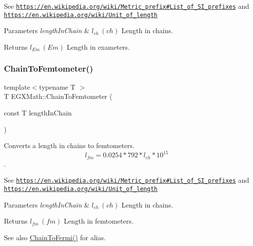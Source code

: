 See \href{https://en.wikipedia.org/wiki/Metric_prefix#List_of_SI_prefixes}{\tt https\+://en.\+wikipedia.\+org/wiki/\+Metric\+\_\+prefix\#\+List\+\_\+of\+\_\+\+S\+I\+\_\+prefixes} and \href{https://en.wikipedia.org/wiki/Unit_of_length}{\tt https\+://en.\+wikipedia.\+org/wiki/\+Unit\+\_\+of\+\_\+length} 
\begin{DoxyParams}{Parameters}
{\em length\+In\+Chain} & $ l_{ch}\ (ch)$ Length in chains. \\
\hline
\end{DoxyParams}
\begin{DoxyReturn}{Returns}
$ l_{Em}\ (Em)$ Length in exameters. 
\end{DoxyReturn}
\mbox{\label{group___e_g_x_math-_conversions-_length_conversions-_surveyors-_chain-_s_i_ga21bde6f9a920aced344185d4ed645183}} 
\subsubsection{\texorpdfstring{Chain\+To\+Femtometer()}{ChainToFemtometer()}}
{\footnotesize\ttfamily template$<$typename T $>$ \\
T E\+G\+X\+Math\+::\+Chain\+To\+Femtometer (\begin{DoxyParamCaption}\item[{const T}]{length\+In\+Chain }\end{DoxyParamCaption})}



Converts a length in chains to femtometers. \[ l_{fm}=0.0254 * 792 * l_{ch} * 10^{15} \]. 

See \href{https://en.wikipedia.org/wiki/Metric_prefix#List_of_SI_prefixes}{\tt https\+://en.\+wikipedia.\+org/wiki/\+Metric\+\_\+prefix\#\+List\+\_\+of\+\_\+\+S\+I\+\_\+prefixes} and \href{https://en.wikipedia.org/wiki/Unit_of_length}{\tt https\+://en.\+wikipedia.\+org/wiki/\+Unit\+\_\+of\+\_\+length} 
\begin{DoxyParams}{Parameters}
{\em length\+In\+Chain} & $ l_{ch}\ (ch)$ Length in chains. \\
\hline
\end{DoxyParams}
\begin{DoxyReturn}{Returns}
$ l_{fm}\ (fm)$ Length in femtometers. 
\end{DoxyReturn}
\begin{DoxySeeAlso}{See also}
\mbox{\hyperlink{group___e_g_x_math-_conversions-_length_conversions-_surveyors-_chain-_non-_s_i_ga88b0e20b062ca36346a6daeb5052c40a}{Chain\+To\+Fermi()}} for alias. 
\end{DoxySeeAlso}
\mbox{\label{group___e_g_x_math-_conversions-_length_conversions-_surveyors-_chain-_s_i_ga4e3a17428c28a61c1aaf1de8c094f31d}} 
